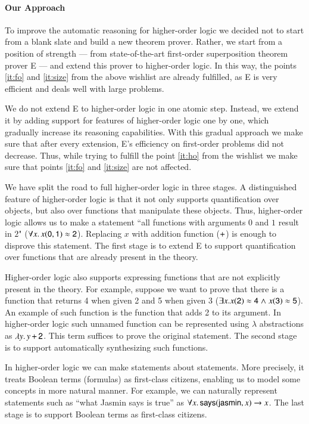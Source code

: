 \paragraph{Our Approach} To improve the automatic reasoning for higher-order
logic we decided not to start from a blank slate and build a new theorem prover.
Rather, we start from a position of strength --- from state-of-the-art
first-order superposition theorem prover E \cite{scv-19-e23} --- and extend this
prover to higher-order logic. In this way, the points \ref{it:fo} and
\ref{it:size} from the above wishlist are already fulfilled, as E is very
efficient and deals well with large problems.

We do not extend E to higher-order logic in one atomic step. Instead, we extend
it by adding support for features of higher-order logic one by one,
which gradually increase its reasoning capabilities. With this gradual
approach we make sure that after every extension, E's
efficiency on first-order problems did not decrease. Thus, while trying
to fulfill the point \ref{it:ho} from the wishlist we make sure that points
\ref{it:fo} and \ref{it:size} are not affected.

We have split the road to full higher-order logic in three stages. A
distinguished feature of higher-order logic is that it not only supports
quantification over objects, but also over functions that manipulate these
objects. Thus, higher-order logic allows us to make a statement ``all functions
with arguments $0$ and $1$ result in $2$" ($\forall x. \,  x (\mathsf{0}, \mathsf{1}) \approx
\mathsf{2}$). Replacing $x$ with addition function ($\mathsf{+}$) is enough to
disprove this statement. The first stage is to extend E to support
quantification over functions that are already present in the theory.

Higher-order logic also supports expressing functions that are not explicitly
present in the theory. For example, suppose we want to prove that there is a
function that returns 4 when given 2 and 5 when given 3 ($\exists x. x(\mathsf{2})
\approx \mathsf{4} \mathrel\land x (\mathsf{3}) \approx \mathsf{5} $). An example of such function is
the function that adds 2 to its argument. In higher-order logic such unnamed
function can be represented using $\lambda$ abstractions as $\lambda y.\, y \,
\mathsf{+} \, \mathsf{2}$. This term suffices to prove the original statement. The
second stage is to support automatically synthesizing such functions.

In higher-order logic we can make statements about statements. More precisely,
it treats Boolean terms (formulas) as first-class citizens, enabling us to
model some concepts in more natural manner. For example, we can naturally
represent statements such as ``what Jasmin says is true'' as $\forall x. \,
\mathsf{says}(\mathsf{jasmin}, x) \rightarrow x$. The last stage is to support Boolean terms
as first-class citizens.
\pagebreak[2]

